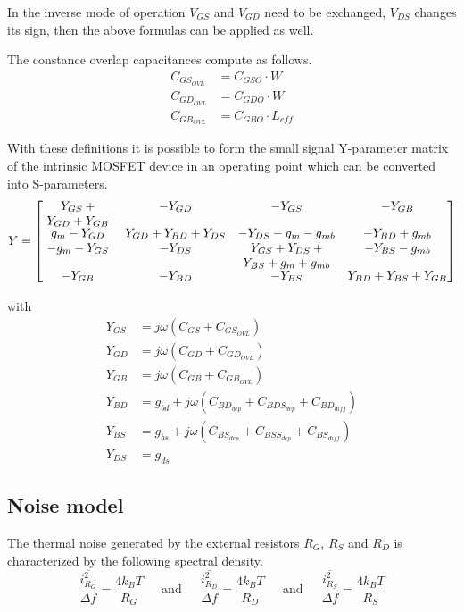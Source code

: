 In the inverse mode of operation $V_{GS}$ and $V_{GD}$ need to be
exchanged, $V_{DS}$ changes its sign, then the above formulas can be
applied as well.

\addvspace{12pt}

The constance overlap capacitances compute as follows.
\begin{align}
C_{GS_{OVL}} &= C_{GSO}\cdot W\\
C_{GD_{OVL}} &= C_{GDO}\cdot W\\
C_{GB_{OVL}} &= C_{GBO}\cdot L_{eff}
\end{align}

With these definitions it is possible to form the small signal
Y-parameter matrix of the intrinsic MOSFET device in an operating
point which can be converted into S-parameters.
\begin{equation}
Y =
\begin{bmatrix}
\parbox[t]{2.0cm}{\centering $Y_{GS} + Y_{GD} + Y_{GB}$} & -Y_{GD} & -Y_{GS} & -Y_{GB}\\
g_{m} - Y_{GD} & Y_{GD} + Y_{BD} + Y_{DS} & -Y_{DS} - g_{m} - g_{mb} & -Y_{BD} + g_{mb}\\
-g_{m} - Y_{GS} & -Y_{DS} & \parbox[t]{2.5cm}{\centering $Y_{GS} + Y_{DS} + Y_{BS} + g_{m} + g_{mb}$} & -Y_{BS} - g_{mb}\\
-Y_{GB} & -Y_{BD} & -Y_{BS} & Y_{BD} + Y_{BS} + Y_{GB}\\
\end{bmatrix}
\end{equation}

with
\begin{align}
Y_{GS} &= j\omega \left(C_{GS} + C_{GS_{OVL}}\right)\\
Y_{GD} &= j\omega \left(C_{GD} + C_{GD_{OVL}}\right)\\
Y_{GB} &= j\omega \left(C_{GB} + C_{GB_{OVL}}\right)\\
Y_{BD} &= g_{bd} + j\omega \left(C_{BD_{dep}} + C_{BDS_{dep}} + C_{BD_{diff}}\right)\\
Y_{BS} &= g_{bs} + j\omega \left(C_{BS_{dep}} + C_{BSS_{dep}} + C_{BS_{diff}}\right)\\
Y_{DS} &= g_{ds}
\end{align}

\subsection{Noise model}

The thermal noise generated by the external resistors $R_G$, $R_S$ and
$R_D$ is characterized by the following spectral density.
\begin{equation}
\dfrac{\overline{i_{R_G}^2}}{\Delta f} = \dfrac{4 k_B T}{R_G}
\;\;\;\; \textrm{ and } \;\;\;\;
\dfrac{\overline{i_{R_D}^2}}{\Delta f} = \dfrac{4 k_B T}{R_D}
\;\;\;\; \textrm{ and } \;\;\;\;
\dfrac{\overline{i_{R_S}^2}}{\Delta f} = \dfrac{4 k_B T}{R_S}
\end{equation}

